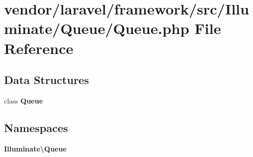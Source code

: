 \section{vendor/laravel/framework/src/\+Illuminate/\+Queue/\+Queue.php File Reference}
\label{vendor_2laravel_2framework_2src_2_illuminate_2_queue_2queue_8php}
\subsection*{Data Structures}
\begin{DoxyCompactItemize}
\item 
class {\bf Queue}
\end{DoxyCompactItemize}
\subsection*{Namespaces}
\begin{DoxyCompactItemize}
\item 
 {\bf Illuminate\textbackslash{}\+Queue}
\end{DoxyCompactItemize}
